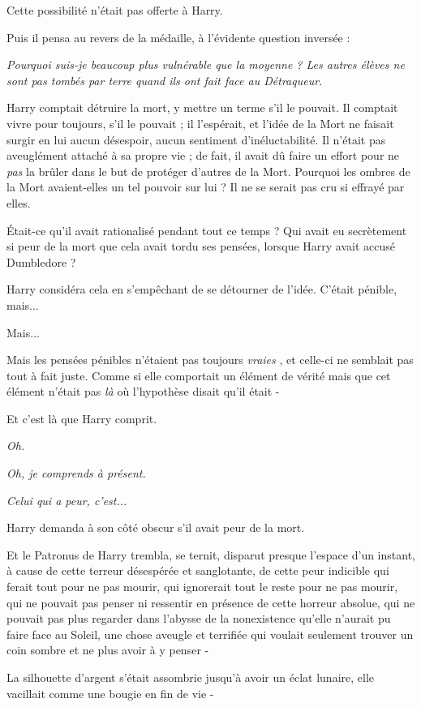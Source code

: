 Cette possibilité n'était pas offerte à Harry.

Puis il pensa au revers de la médaille, à l'évidente question inversée :

\emph{Pourquoi suis-je beaucoup plus vulnérable que la moyenne ? Les autres élèves ne sont pas tombés par terre quand ils ont fait face au Détraqueur.} 

Harry comptait détruire la mort, y mettre un terme s'il le pouvait. Il comptait vivre pour toujours, s'il le pouvait ; il l'espérait, et l'idée de la Mort ne faisait surgir en lui aucun désespoir, aucun sentiment d'inéluctabilité. Il n'était pas aveuglément attaché à sa propre vie ; de fait, il avait dû faire un effort pour ne \emph{pas}  la brûler dans le but de protéger d'autres de la Mort. Pourquoi les ombres de la Mort avaient-elles un tel pouvoir sur lui ? Il ne se serait pas cru si effrayé par elles.

Était-ce qu'il avait rationalisé pendant tout ce temps ? Qui avait eu secrètement si peur de la mort que cela avait tordu ses pensées, lorsque Harry avait accusé Dumbledore ?

Harry considéra cela en s'empêchant de se détourner de l'idée. C'était pénible, mais...

Mais...

Mais les pensées pénibles n'étaient pas toujours \emph{vraies} , et celle-ci ne semblait pas tout à fait juste. Comme si elle comportait un élément de vérité mais que cet élément n'était pas \emph{là}  où l'hypothèse disait qu'il était -

Et c'est là que Harry comprit.

\emph{Oh.} 

\emph{Oh, je comprends à présent.} 

\emph{Celui qui a peur, c'est...} 

Harry demanda à son côté obscur s'il avait peur de la mort.

Et le Patronus de Harry trembla, se ternit, disparut presque l'espace d'un instant, à cause de cette terreur désespérée et sanglotante, de cette peur indicible qui ferait tout pour ne pas mourir, qui ignorerait tout le reste pour ne pas mourir, qui ne pouvait pas penser ni ressentir en présence de cette horreur absolue, qui ne pouvait pas plus regarder dans l'abysse de la nonexistence qu'elle n'aurait pu faire face au Soleil, une chose aveugle et terrifiée qui voulait seulement trouver un coin sombre et ne plus avoir à y penser -

La silhouette d'argent s'était assombrie jusqu'à avoir un éclat lunaire, elle vacillait comme une bougie en fin de vie -


